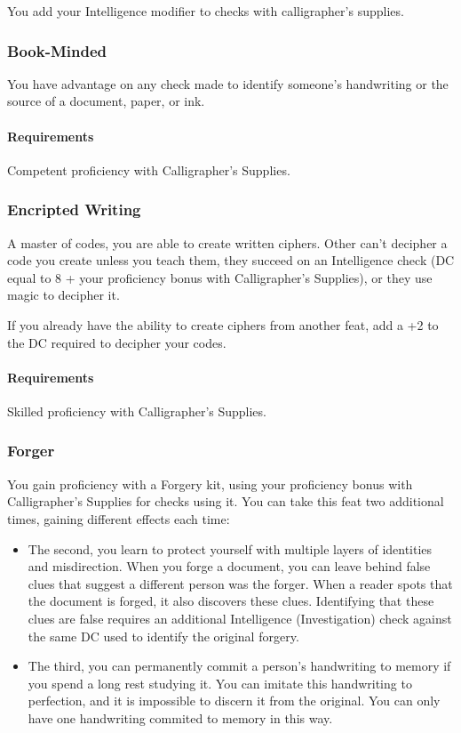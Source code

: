     You add your Intelligence modifier to checks with calligrapher's supplies.
\subsubsection{Book-Minded} \label{feat::bookminded}
    You have advantage on any check made to identify someone's handwriting or the source of a document, paper, or ink.
    \paragraph{Requirements} Competent proficiency with Calligrapher's Supplies.
\subsubsection{Encripted Writing} \label{feat::encriptedwriting}
    A master of codes, you are able to create written ciphers.
    Other can't decipher a code you create unless you teach them, they succeed on an Intelligence check (DC equal to 8 + your proficiency bonus with Calligrapher's Supplies), or they use magic to decipher it.

    If you already have the ability to create ciphers from another feat, add a +2 to the DC required to decipher your codes.
    \paragraph{Requirements} Skilled proficiency with Calligrapher's Supplies.
\subsubsection{Forger} \label{feat::forger}
    You gain proficiency with a Forgery kit, using your proficiency bonus with Calligrapher's Supplies for checks using it.
    You can take this feat two additional times, gaining different effects each time:
    \begin{itemize}
        \item The second, you learn to protect yourself with multiple layers of identities and misdirection.
        When you forge a document, you can leave behind false clues that suggest a different person was the forger.
        When a reader spots that the document is forged, it also discovers these clues.
        Identifying that these clues are false requires an additional Intelligence (Investigation) check against the same DC used to identify the original forgery.
        \item The third, you can permanently commit a person's handwriting to memory if you spend a long rest studying it.
        You can imitate this handwriting to perfection, and it is impossible to discern it from the original.
        You can only have one handwriting commited to memory in this way.
    \end{itemize}
